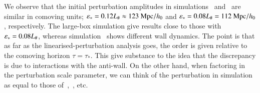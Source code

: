 We observe that the initial perturbation amplitudes in simulations~ and~ are similar in comoving units; $\varepsilon_\ast =0.12L_\#\approx 123~\mathrm{Mpc}/h_0$ and $ \varepsilon_\ast =0.08L_\# = 112~ \mathrm{Mpc}/h_0$, respectively. The large-box simulation give results close to those with $\varepsilon_\ast =0.08L_\#$, whereas simulation~ shows different wall dynamics. The point is that as far as the linearised-perturbation analysis goes, the order is given relative to the comoving horizon $\tau=\tau_\ast$. This give substance to the idea that the discrepancy is due to interactions with the anti-wall. On the other hand, when factoring in the perturbation scale parameter, we can think of the perturbation in simulation~ as equal to those of~,~, etc. 

    
    


    

   







